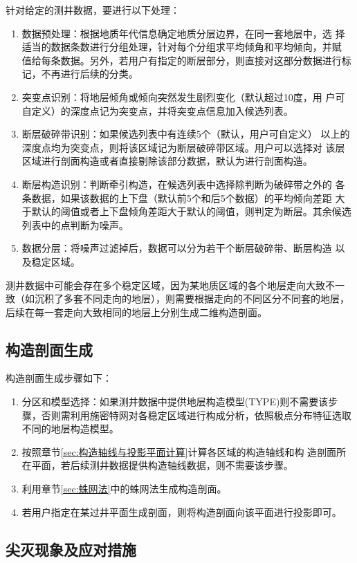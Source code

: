 \documentclass[a4paper,twoside]{ctexart}
\begin{document}
针对给定的测井数据，要进行以下处理：
\begin{enumerate}[步骤 1:]
\item 数据预处理：根据地质年代信息确定地质分层边界，在同一套地层中，选
  择适当的数据条数进行分组处理，针对每个分组求平均倾角和平均倾向，并赋
  值给每条数据。另外，若用户有指定的断层部分，则直接对这部分数据进行标
  记，不再进行后续的分类。
\item 突变点识别：将地层倾角或倾向突然发生剧烈变化（默认超过10度，用
  户可自定义）的深度点记为突变点，并将突变点信息加入候选列表。
\item 断层破碎带识别：如果候选列表中有连续5个（默认，用户可自定义）
  以上的深度点均为突变点，则将该区域记为断层破碎带区域。用户可以选择对
  该层区域进行剖面构造或者直接剔除该部分数据，默认为进行剖面构造。
\item 断层构造识别：判断牵引构造，在候选列表中选择除判断为破碎带之外的
  各条数据，如果该数据的上下盘（默认前5个和后5个数据）的平均倾向差距
  大于默认的阈值或者上下盘倾角差距大于默认的阈值，则判定为断层。其余候选
  列表中的点判断为噪声。
\item 数据分层：将噪声过滤掉后，数据可以分为若干个断层破碎带、断层构造
  以及稳定区域。 
\end{enumerate}

测井数据中可能会存在多个稳定区域，因为某地质区域的各个地层走向大致不一
致（如沉积了多套不同走向的地层），则需要根据走向的不同区分不同套的地层，
后续在每一套走向大致相同的地层上分别生成二维构造剖面。

\subsection{构造剖面生成}

构造剖面生成步骤如下：
\begin{enumerate}[步骤 1:]
\item 分区和模型选择：如果测井数据中提供地层构造模型(TYPE)则不需要该步
  骤，否则需利用施密特网对各稳定区域进行构成分析，依照极点分布特征选取
  不同的地层构造模型。 
\item 按照章节\ref{sec:构造轴线与投影平面计算}计算各区域的构造轴线和构
  造剖面所在平面，若后续测井数据提供构造轴线数据，则不需要该步骤。
\item 利用章节\ref{sec:蛛网法}中的蛛网法生成构造剖面。
\item 若用户指定在某过井平面生成剖面，则将构造剖面向该平面进行投影即可。
\end{enumerate}

\subsection{尖灭现象及应对措施}
\end{document}
